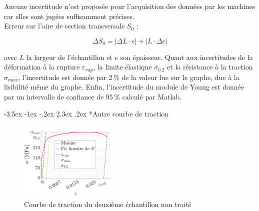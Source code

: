 \documentclass[a4paper, 12pt,oneside]{article}
\makeatletter
\renewcommand{\subsection}{\@startsection {subsection}{1}{\z@}%
             {-3.5ex \@plus -1ex \@minus -.2ex}%
             {2.3ex \@plus.2ex}%
             {\normalfont\normalsize\bfseries}}
\makeatother
\begin{document}
Aucune incertitude n'est proposée pour l'acquisition des données par les machines car elles sont jugées suffisamment précises. \\

Erreur sur l'aire de section transversale $S_0$ :

\[
\Delta S_0 = \left| \Delta L \cdot e\right| + \left| L \cdot \Delta e \right|
\]

\noindent avec $L$ la largeur de l'échantillon et $e$ son épaisseur. Quant aux incertitudes de la déformation à la rupture $\varepsilon_{rup}$, la limite élastique $\sigma_{0.2}$ et la résistance à la traction $\sigma_{max}$, l'incertitude est donnée par 2\,\% de la valeur lue sur le graphe, due à la lisibilité même du graphe. Enfin, l'incertitude du module de Young est donnée par un intervalle de confiance de 95\,\% calculé par Matlab. 


\subsection*{Autre courbe de traction}

\begin{figure}[H]
    \centering
\includegraphics[width=0.45\textwidth]{GRAPHES/Graphe_2.jpg}
    \captionsetup{justification=centering}
    \caption{Courbe de traction du deuxième échantillon non traité}
    \label{fig10}
\end{figure}
\end{document}
